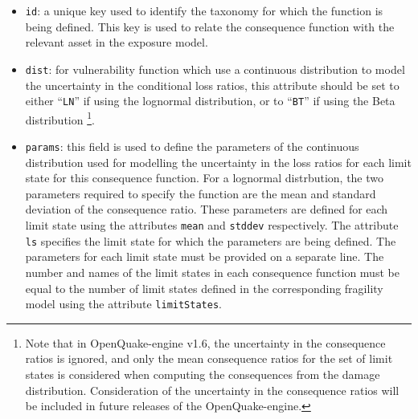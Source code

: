 \begin{itemize}

    \item \Verb+id+: a unique key used to identify the \gls{taxonomy} for 
    which the function is being defined. This key is used to relate the 
    \gls{consequence function} with the relevant \gls{asset} in the 
    \gls{exposure model}.

    \item \Verb+dist+: for vulnerability function which use a continuous 
    distribution to model the uncertainty in the conditional loss ratios, 
    this attribute should be set to either ``\Verb+LN+'' if using the lognormal
    distribution, or to ``\Verb+BT+'' if using the Beta distribution
    \footnote{Note that in OpenQuake-engine v1.6, the uncertainty in the 
    consequence ratios is ignored, and only the mean consequence ratios for the
    set of limit states is considered when computing the consequences from the
    damage distribution. Consideration of the uncertainty in the consequence
    ratios will be included in future releases of the OpenQuake-engine.}.

    \item \Verb+params+: this field is used to define the parameters of 
    the continuous distribution used for modelling the uncertainty in the
    loss ratios for each limit state for this 
    \gls{consequence function}. For a lognormal distrbution, 
    the two parameters required to specify the function are the mean and 
    standard deviation of the consequence ratio. These parameters are defined for 
    each limit state using the attributes \Verb+mean+ and \Verb+stddev+ 
    respectively. The attribute \Verb+ls+ specifies the limit state for which 
    the parameters are being defined. The parameters for each limit state
    must be provided on a separate line. The number and names of the limit 
    states in each consequence function must be equal to the number of limit 
    states defined in the corresponding \gls{fragility model}
    using the attribute \Verb+limitStates+.

\end{itemize}